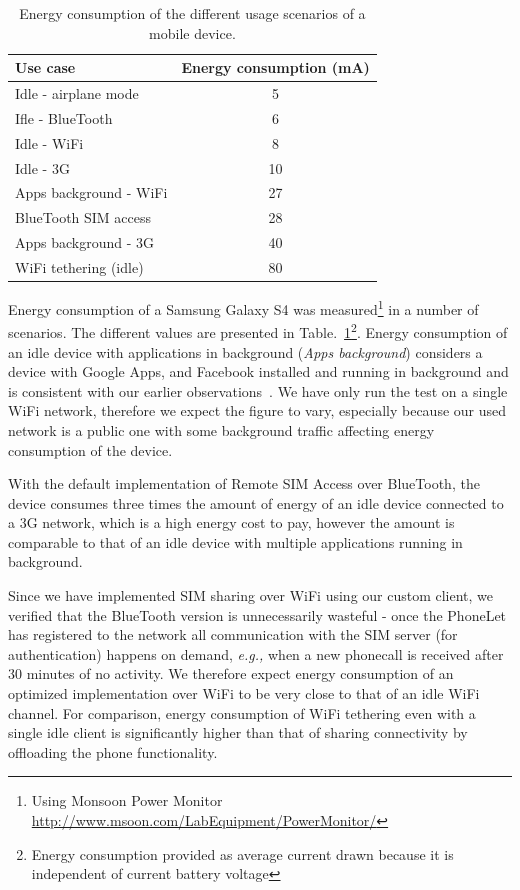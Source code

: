 \documentclass{sig-alternate-10pt}
\providecommand{\eg}{\emph{e.g.,} }
\begin{document}
\begin{table}[t]
{
\small
\begin{tabular}{| l | c |}
\hline
  \textbf{Use case}         & \textbf{Energy consumption (mA)}  \\ \hline
  Idle - airplane mode      & 5     \\ \hline
  Ifle - BlueTooth          & 6     \\ \hline
  Idle - WiFi               & 8     \\ \hline
  Idle - 3G                 & 10    \\ \hline
  Apps background - WiFi    & 27    \\ \hline
  BlueTooth SIM access      & 28    \\ \hline
  Apps background - 3G      & 40    \\ \hline
  WiFi tethering (idle)     & 80    \\ \hline
\end{tabular}
}
\vspace{-2mm}
\caption{Energy consumption of the different usage scenarios of a mobile device.}
\label{tab:energy}
\vspace{-3mm}
\end{table}

Energy consumption of a Samsung Galaxy S4 was measured\footnote{Using Monsoon Power Monitor \url{http://www.msoon.com/LabEquipment/PowerMonitor/}} in a number of scenarios. The different values are presented in Table.~\ref{tab:energy}\footnote{Energy consumption provided as average current drawn because it is independent of current battery voltage}. Energy consumption of an idle device with applications in background (\emph{Apps background}) considers a device with Google Apps, and Facebook installed and running in background and is consistent with our earlier observations~\cite{Aucinas:2013uk}. We have only run the test on a single WiFi network, therefore we expect the figure to vary, especially because our used network is a public one with some background traffic affecting energy consumption of the device.

With the default implementation of Remote SIM Access over BlueTooth, the device consumes three times the amount of energy of an idle device connected to a 3G network, which is a high energy cost to pay, however the amount is comparable to that of an idle device with multiple applications running in background.

Since we have implemented SIM sharing over WiFi using our custom client, we verified that the BlueTooth version is unnecessarily wasteful - once the PhoneLet has registered to the network all communication with the SIM server (for authentication) happens on demand, \eg when a new phonecall is received after 30 minutes of no activity. We therefore expect energy consumption of an optimized implementation over WiFi to be very close to that of an idle WiFi channel. For comparison, energy consumption of WiFi tethering even with a single idle client is significantly higher than that of sharing connectivity by offloading the phone functionality. 
\end{document}
